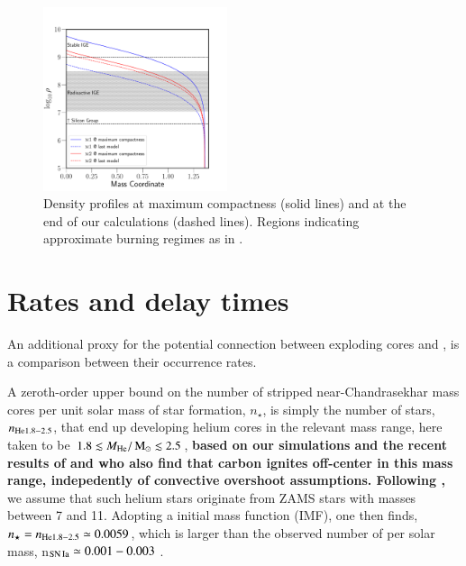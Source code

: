 \documentclass[twocolumn]{aa}
\begin{document}
\begin{figure}
\begin{center}
\includegraphics[width=0.48\textwidth]{composition.pdf}
\caption{Density profiles at maximum compactness (solid lines) and at the end of our \mesa calculations (dashed lines). Regions indicating approximate burning regimes as in \cite{Seitenzahl2017}.}
\label{fig:nuc}
\end{center}
\end{figure}


\section{Rates and delay times}\label{sec:4}
An additional  proxy for the potential connection between exploding \one cores and \ia, is a comparison between their  occurrence rates. 

A zeroth-order upper bound on the number of stripped near-Chandrasekhar mass \one cores per unit solar mass of star formation, $n_\star$, is 
simply the number of stars, $n_{\rm{He}1.8-2.5}$, that end up developing  helium cores in the relevant mass range, here taken to be $1.8\lesssim M_{\rm{He}}/\mathrm{\,M_\odot} \lesssim 2.5$, {\bf based on our simulations and the recent results of \cite{Woosley:2019sdf} and \cite{Farmer:2015afs} who also find that carbon ignites off-center in this mass range, indepedently of convective overshoot assumptions. Following 
\cite{Farmer:2015afs},} we assume that such helium stars originate from ZAMS stars with masses between 7 and 11\msun. Adopting a \cite{Chabrier:2004vw} initial mass function (IMF), one then finds,  $n_\star=n_{\rm{He}1.8-2.5}\simeq 0.0059$, which is larger than the observed number of \ias per solar mass, n$_{\rm SN\,Ia}\simeq 0.001-0.003$ \citep[e.g][]{claeys2014a,Maoz:2013hna}.
\end{document}
